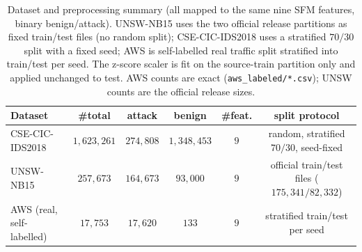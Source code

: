 \documentclass[preprint,12pt,authoryear]{elsarticle}
\begin{document}
\begin{table}[h]
\centering
\caption{Dataset and preprocessing summary (all mapped to the same nine SFM
features, binary benign/attack). UNSW-NB15 uses the two official release partitions
as fixed train/test files (no random split); CSE-CIC-IDS2018 uses a stratified
$70/30$ split with a fixed seed; AWS is self-labelled real traffic split stratified
into train/test per seed. The z-score scaler is fit on the source-train partition
only and applied unchanged to test. AWS counts are exact
(\texttt{aws\_labeled/*.csv}); UNSW counts are the official release sizes.}
\label{tab:dataset}
\small
\begin{tabular}{lccccc}
\toprule
Dataset & \#total & attack & benign & \#feat. & split protocol \\
\midrule
CSE-CIC-IDS2018~\citep{sharafaldin2018} & $1{,}623{,}261$ & $274{,}808$ & $1{,}348{,}453$ & $9$ & random, stratified $70/30$, seed-fixed \\
UNSW-NB15~\citep{moustafa2015}          & $257{,}673$ & $164{,}673$ & $93{,}000$ & $9$ & official train/test files ($175{,}341/82{,}332$) \\
AWS (real, self-labelled)              & $17{,}753$ & $17{,}620$ & $133$ & $9$ & stratified train/test per seed \\
\bottomrule
\end{tabular}

\vspace{0.3em}
\end{table}
\end{document}
